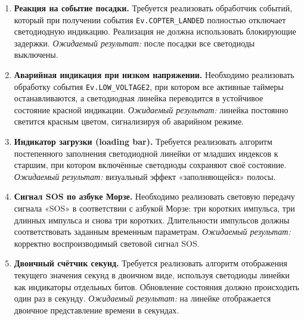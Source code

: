 \begin{enumerate}[resume]
  \item \textbf{Реакция на событие посадки.}  
  Требуется реализовать обработчик событий, который при получении события \verb|Ev.COPTER_LANDED| полностью отключает светодиодную индикацию. Реализация не должна использовать блокирующие задержки.  
  \textit{Ожидаемый результат:} после посадки все светодиоды выключены.

  \item \textbf{Аварийная индикация при низком напряжении.}  
  Необходимо реализовать обработку события \verb|Ev.LOW_VOLTAGE2|, при котором все активные таймеры останавливаются, а светодиодная линейка переводится в устойчивое состояние красной индикации.  
  \textit{Ожидаемый результат:} линейка постоянно светится красным цветом, сигнализируя об аварийном режиме.

  \item \textbf{Индикатор загрузки (loading bar).}  
  Требуется реализовать алгоритм постепенного заполнения светодиодной линейки от младших индексов к старшим, при котором включённые светодиоды сохраняют своё состояние.  
  \textit{Ожидаемый результат:} визуальный эффект «заполняющейся» полосы.

  \item \textbf{Сигнал SOS по азбуке Морзе.}  
  Необходимо реализовать световую передачу сигнала «SOS» в соответствии с азбукой Морзе: три коротких импульса, три длинных импульса и снова три коротких. Длительности импульсов должны соответствовать заданным временным параметрам.  
  \textit{Ожидаемый результат:} корректно воспроизводимый световой сигнал SOS.

  \item \textbf{Двоичный счётчик секунд.}  
  Требуется реализовать алгоритм отображения текущего значения секунд в двоичном виде, используя светодиоды линейки как индикаторы отдельных битов. Обновление состояния должно происходить один раз в секунду.  
  \textit{Ожидаемый результат:} на линейке отображается двоичное представление времени в секундах.
\end{enumerate}
